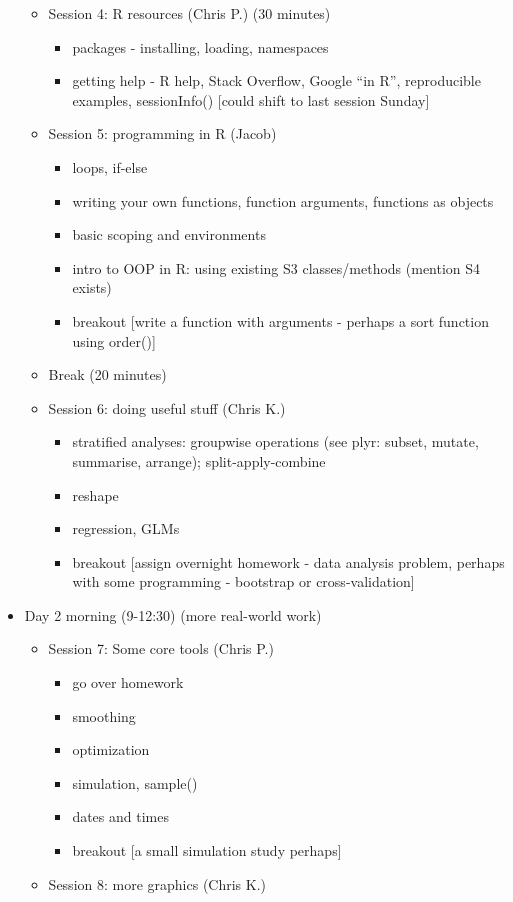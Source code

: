 \documentclass[12pt]{article}\usepackage{graphicx, color}
\begin{document}
\begin{itemize}
\begin{itemize}
\item Session 4: R resources (Chris P.) (30 minutes)

\begin{itemize}
\item packages - installing, loading, namespaces
\item getting help - R help, Stack Overflow, Google ``in R'', reproducible
examples, sessionInfo() {[}could shift to last session Sunday{]}
\end{itemize}
\item Session 5: programming in R (Jacob)

\begin{itemize}
\item loops, if-else
\item writing your own functions, function arguments, functions as objects
\item basic scoping and environments
\item intro to OOP in R: using existing S3 classes/methods (mention S4 exists)
\item breakout {[}write a function with arguments - perhaps a sort function
using order(){]}
\end{itemize}
\item Break (20 minutes)
\item Session 6: doing useful stuff (Chris K.)

\begin{itemize}
\item stratified analyses: groupwise operations (see plyr: subset, mutate,
summarise, arrange); split-apply-combine
\item reshape
\item regression, GLMs
\item breakout {[}assign overnight homework - data analysis problem, perhaps
with some programming - bootstrap or cross-validation{]}
\end{itemize}
\end{itemize}
\item Day 2 morning (9-12:30) (more real-world work)

\begin{itemize}
\item Session 7: Some core tools (Chris P.)

\begin{itemize}
\item go over homework
\item smoothing
\item optimization
\item simulation, sample()
\item dates and times
\item breakout {[}a small simulation study perhaps{]}
\end{itemize}
\item Session 8: more graphics (Chris K.)


\end{itemize}
\end{itemize}
\end{document}
